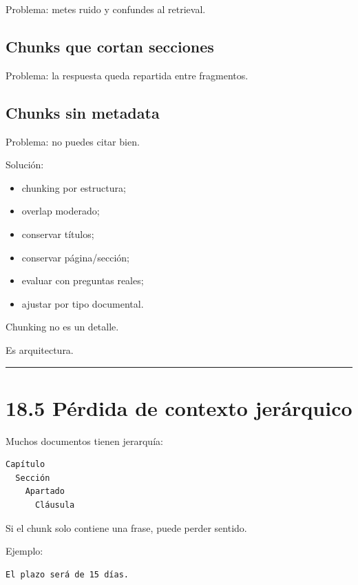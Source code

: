 Problema: metes ruido y confundes al retrieval.

\subsection{Chunks que cortan
secciones}\label{chunks-que-cortan-secciones}

Problema: la respuesta queda repartida entre fragmentos.

\subsection{Chunks sin metadata}\label{chunks-sin-metadata}

Problema: no puedes citar bien.

Solución:

\begin{itemize}
\tightlist
\item
  chunking por estructura;
\item
  overlap moderado;
\item
  conservar títulos;
\item
  conservar página/sección;
\item
  evaluar con preguntas reales;
\item
  ajustar por tipo documental.
\end{itemize}

Chunking no es un detalle.

Es arquitectura.

\begin{center}\rule{0.5\linewidth}{0.5pt}\end{center}

\section{18.5 Pérdida de contexto
jerárquico}\label{puxe9rdida-de-contexto-jeruxe1rquico}

Muchos documentos tienen jerarquía:

\begin{lstlisting}
Capítulo
  Sección
    Apartado
      Cláusula
\end{lstlisting}

Si el chunk solo contiene una frase, puede perder sentido.

Ejemplo:

\begin{lstlisting}
El plazo será de 15 días.
\end{lstlisting}

